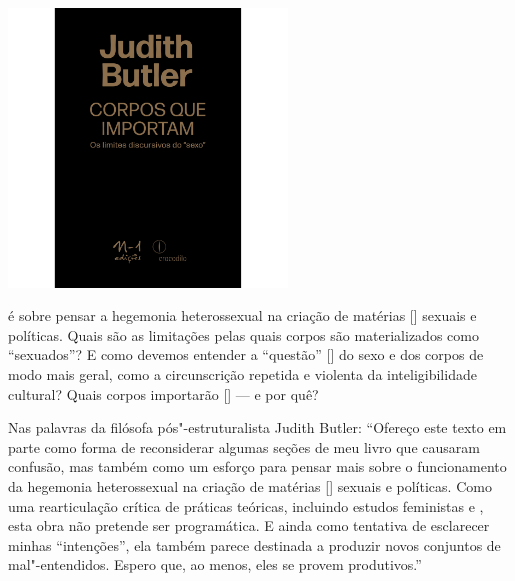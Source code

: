 \vfill

\hspace*{-.4cm}\begin{minipage}[c]{.5\linewidth}
\small{
{}}
\end{minipage}

\pagebreak %


\begin{center}
\hspace*{.5cm}\includegraphics[width=74mm]{./grid/butler.png}
\end{center}

\hspace*{-7cm}\hrulefill\hspace*{-7cm}

\medskip

 é sobre pensar a hegemonia heterossexual na criação de matérias [{}] sexuais e políticas. Quais são as limitações pelas quais corpos são materializados como “sexuados”? E como devemos entender a “questão” [{}] do sexo e dos corpos de modo mais geral, como a circunscrição repetida e violenta da inteligibilidade cultural? Quais corpos importarão [{}] --- e por quê?

Nas palavras da filósofa pós"-estruturalista Judith Butler: “Ofereço este texto em parte como forma de reconsiderar algumas seções de meu livro {} que causaram confusão, mas também como um esforço para pensar mais sobre o funcionamento da hegemonia heterossexual na criação de matérias [{}] sexuais e políticas. Como uma rearticulação crítica de práticas teóricas, incluindo estudos feministas e {}, esta obra não pretende ser programática. E ainda como tentativa de esclarecer minhas “intenções”, ela também parece destinada a produzir novos conjuntos de mal"-entendidos. Espero que, ao menos, eles se provem produtivos.”


